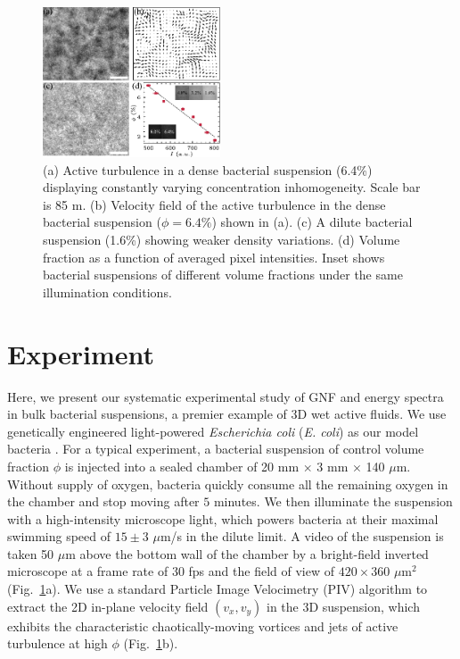 \documentclass[twocolumn,aps,prx,amsmath,amssymb,longbibliography]{revtex4-2}
\begin{document}
\begin{figure}[ht]
\begin{center}
\includegraphics[width=0.47\textwidth]{Figures/experiment/v5.pdf}
\caption[Experimental details]
{
(a) Active turbulence in a dense bacterial suspension (6.4\%) displaying constantly varying concentration inhomogeneity. Scale bar is 85 \textmu m.
(b) Velocity field of the active turbulence in the dense bacterial suspension ($\phi=6.4\%$) shown in (a).
(c) A dilute bacterial suspension (1.6\%) showing weaker density variations.
(d) Volume fraction as a function of averaged pixel intensities. Inset shows bacterial suspensions of different volume fractions under the same illumination conditions.
}
\label{fig:experiment}
\end{center}
\end{figure}

\section{Experiment}

Here, we present our systematic experimental study of GNF and energy spectra in bulk bacterial suspensions, a premier example of 3D wet active fluids. We use genetically engineered light-powered \textit{Escherichia coli} (\textit{E. coli}) as our model bacteria \cite{Liu2020}.
For a typical experiment, a bacterial suspension of control volume fraction $\phi$ is injected into a sealed chamber of 20 mm $\times$ 3 mm $\times$ 140 $\mu$m.
Without supply of oxygen, bacteria quickly consume all the remaining oxygen in the chamber and stop moving after $5$ minutes.
We then illuminate the suspension with a high-intensity microscope light, which powers bacteria at their maximal swimming speed of $15 \pm 3$ $\mu$m/s in the dilute limit.
A video of the suspension is taken 50 $\mu$m above the bottom wall of the chamber by a bright-field inverted microscope at a frame rate of $30$ fps and the field of view of $420 \times 360$ $\mu$m$^2$ (Fig.~\ref{fig:experiment}a).
We use a standard Particle Image Velocimetry (PIV) algorithm \cite{Liberzon2020} %
to extract the 2D in-plane velocity field $(v_x,v_y)$ in the 3D suspension, which exhibits the characteristic chaotically-moving vortices and jets of active turbulence at high $\phi$ (Fig.~\ref{fig:experiment}b).
\end{document}

